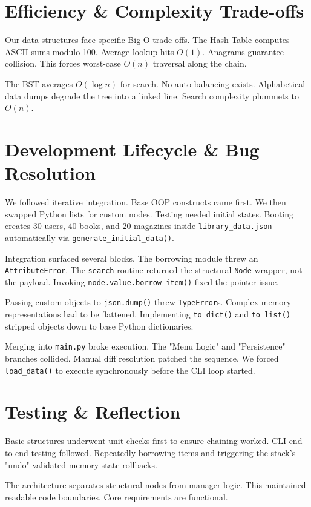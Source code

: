 \documentclass[11pt,a4paper]{article}
\begin{document}
\section{Efficiency \& Complexity Trade-offs}
Our data structures face specific Big-O trade-offs. The Hash Table computes ASCII sums modulo 100. Average lookup hits $O(1)$. Anagrams guarantee collision. This forces worst-case $O(n)$ traversal along the chain.

The BST averages $O(\log n)$ for search. No auto-balancing exists. Alphabetical data dumps degrade the tree into a linked line. Search complexity plummets to $O(n)$.

\section{Development Lifecycle \& Bug Resolution}
We followed iterative integration. Base OOP constructs came first. We then swapped Python lists for custom nodes. Testing needed initial states. Booting creates 30 users, 40 books, and 20 magazines inside \texttt{library\_data.json} automatically via \texttt{generate\_initial\_data()}.

Integration surfaced several blocks.
The borrowing module threw an \texttt{AttributeError}. The \texttt{search} routine returned the structural \texttt{Node} wrapper, not the payload. Invoking \texttt{node.value.borrow\_item()} fixed the pointer issue.

Passing custom objects to \texttt{json.dump()} threw \texttt{TypeError}s. Complex memory representations had to be flattened. Implementing \texttt{to\_dict()} and \texttt{to\_list()} stripped objects down to base Python dictionaries.

Merging into \texttt{main.py} broke execution. The "Menu Logic" and "Persistence" branches collided. Manual diff resolution patched the sequence. We forced \texttt{load\_data()} to execute synchronously before the CLI loop started.

\section{Testing \& Reflection}
Basic structures underwent unit checks first to ensure chaining worked. CLI end-to-end testing followed. Repeatedly borrowing items and triggering the stack's "undo" validated memory state rollbacks.

The architecture separates structural nodes from manager logic. This maintained readable code boundaries. Core requirements are functional.
\end{document}
